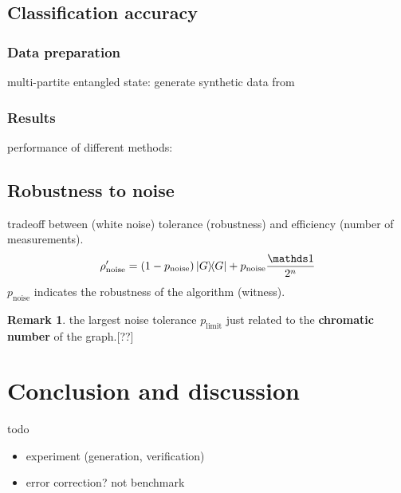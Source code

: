 \documentclass[
10pt,
aps,
pra,
linenumbers,
floatfix,
]{revtex4-2}
\theoremstyle{plain}
\theoremstyle{definition}
\newtheorem{remark}{Remark}
\newcommand{\noise}{\text{noise}}
\newcommand{\dm}{\rho}
\begin{document}
\subsection{Classification accuracy}
\subsubsection{Data preparation}
multi-partite entangled state: generate synthetic data from

\subsubsection{Results}
performance of different methods: 

\subsection{Robustness to noise}
tradeoff between (white noise) tolerance (robustness) and efficiency (number of measurements).
\begin{equation}
	\dm_{\noise}' = (1-p_{\noise}) \op{G} + p_{\noise} \frac{\identity}{2^n}
\end{equation}
$p_{\noise}$ indicates the robustness of the algorithm (witness).
\begin{remark}
	the largest noise tolerance $p_{\text{limit}}$ just related to the \textbf{chromatic number} of the graph.[??]
\end{remark}
% 
% 

\section{Conclusion and discussion}
todo
\begin{itemize}
	\item experiment (generation, verification) \cite{luEntanglementStructureEntanglement2018}
	\item error correction? not benchmark
\end{itemize}
\end{document}
